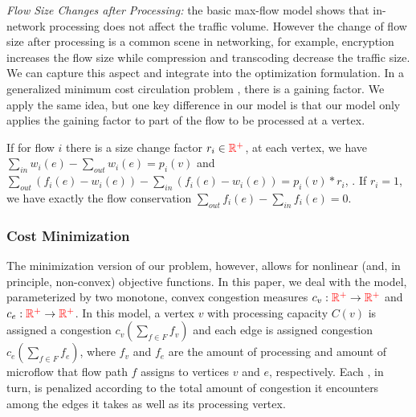 \emph{Flow Size Changes after Processing:} the basic max-flow model shows that in-network processing does not affect the traffic volume. However the change of flow size after processing is a common scene in networking, for example, encryption increases the flow size while compression and transcoding decrease the traffic size\cite{Mogul1997}. We can capture this aspect and integrate into the optimization formulation. In a generalized minimum cost circulation problem \cite{Wayne1999}, there is a gaining factor. We apply the same idea, but one key difference in our model is that our model only applies the gaining factor to part of the flow to be processed at a vertex. 

If for flow $i$ there is a size change factor $r_i\in {\color{red} {\ensuremath{\mathbb{R}^+}}}$, at each vertex, we have $\sum\limits_{in} w_i(e) - \sum\limits_{out}  w_i(e) = p_i(v)$ and $\sum\limits_{out} (f_i(e) - w_i(e))-\sum\limits_{in}  (f_i(e) - w_i(e))= p_i(v)*r_i$, . If $r_i=1$, we have exactly the flow conservation $\sum\limits_{out} f_i(e) -\sum\limits_{in}  f_i(e)= 0$. 

\subsubsection{Cost Minimization}
The minimization version of our problem, however, allows for nonlinear (and, in principle, non-convex) objective functions. In this paper, we deal with the \textit{} model, parameterized by two monotone, convex congestion measures $c_v : {\color{red} {\ensuremath{\mathbb{R}^+}}} \rightarrow {\color{red} {\ensuremath{\mathbb{R}^+}}}$ and $c_e : {\color{red} {\ensuremath{\mathbb{R}^+}}} \rightarrow {\color{red} {\ensuremath{\mathbb{R}^+}}}$. In this model, a vertex $v$ with processing capacity $C(v)$ is assigned a congestion $c_v(\sum_{f \in F} f_v)$ and each edge is assigned congestion $c_e(\sum_{f \in F} f_e)$, where $f_v$ and $f_e$ are the amount of processing and amount of microflow that flow path $f$ assigns to vertices $v$ and $e$, respectively. Each \textit{}, in turn, is penalized according to the total amount of congestion it encounters among the edges it takes as well as its processing vertex. 

